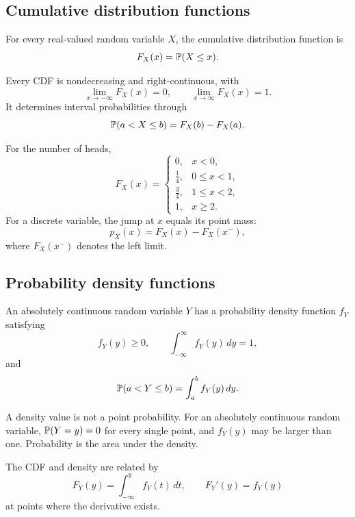 \subsection{Cumulative distribution functions}

\begin{definition}[CDF]
For every real-valued random variable \(X\), the cumulative distribution
function is
\[
  F_X(x)=\mathbb{P}(X\le x).
\]
\end{definition}

Every CDF is nondecreasing and right-continuous, with
\[
  \lim_{x\to-\infty}F_X(x)=0,
  \qquad
  \lim_{x\to\infty}F_X(x)=1.
\]
It determines interval probabilities through
\begin{equation}
  \mathbb{P}(a<X\le b)=F_X(b)-F_X(a).
  \label{eq:cdf-interval}
\end{equation}

For the number of heads,
\[
  F_X(x)=
  \begin{cases}
    0, & x<0,\\
    \frac14, & 0\le x<1,\\
    \frac34, & 1\le x<2,\\
    1, & x\ge2.
  \end{cases}
\]
For a discrete variable, the jump at \(x\) equals its point mass:
\[
  p_X(x)=F_X(x)-F_X(x^-),
\]
where \(F_X(x^-)\) denotes the left limit.

\subsection{Probability density functions}

\begin{definition}[PDF]
An absolutely continuous random variable \(Y\) has a probability density
function \(f_Y\) satisfying
\[
  f_Y(y)\ge0,
  \qquad
  \int_{-\infty}^{\infty}f_Y(y)\,dy=1,
\]
and
\begin{equation}
  \mathbb{P}(a<Y\le b)=\int_a^b f_Y(y)\,dy.
  \label{eq:pdf-interval}
\end{equation}
\end{definition}

\begin{warning}
A density value is not a point probability. For an absolutely continuous
random variable, \(\mathbb{P}(Y=y)=0\) for every single point, and \(f_Y(y)\) may be
larger than one. Probability is the area under the density.
\end{warning}

The CDF and density are related by
\[
  F_Y(y)=\int_{-\infty}^{y}f_Y(t)\,dt,
  \qquad
  F_Y'(y)=f_Y(y)
\]
at points where the derivative exists.

